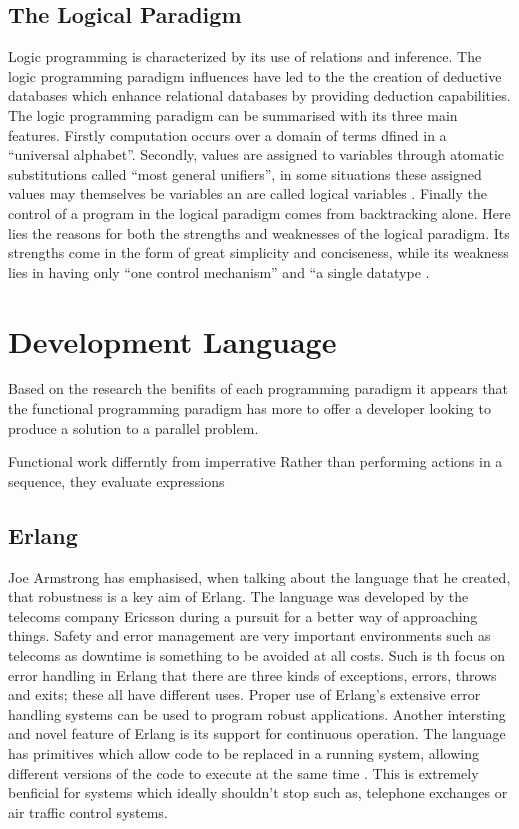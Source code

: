 \documentclass[main.tex]{subfiles}
\begin{document}
\subsection{The Logical Paradigm} %
Logic programming is characterized by its use of relations and inference.\cite{Aaby1996} The logic programming paradigm influences have led to the the creation of deductive databases which enhance relational databases by providing deduction capabilities. The logic programming paradigm can be summarised with its three main features. Firstly computation occurs over a domain of terms dfined in a ``universal alphabet''. Secondly, values are assigned to variables through atomatic substitutions called ``most general unifiers'', in some situations these assigned values may themselves be variables an are called logical variables \cite{Apt2001}. Finally the control of a program in the logical paradigm comes from backtracking alone. Here lies the reasons for both the strengths and weaknesses of the logical paradigm. Its strengths come in the form of great simplicity and conciseness, while its weakness lies in having only ``one control mechanism'' and ``a single datatype \cite{Apt2001}.

\section{Development Language}

Based on the research the benifits of each programming paradigm it appears that the functional programming paradigm has more to offer a developer looking to produce a solution to a parallel problem.

Functional work differntly from imperrative Rather than performing actions in a sequence, they evaluate expressions

\subsection{Erlang}

Joe Armstrong\cite{Armstrong2009} has emphasised, when talking about the language that he created, that robustness is a key aim of Erlang. The language was developed by the telecoms company Ericsson during a pursuit for a better way of approaching things. Safety and error management are very important environments such as telecoms as downtime is something to be avoided at all costs. Such is th focus on error handling in Erlang that there are three kinds of exceptions, errors, throws and exits; these all have different uses\cite{Trottier-Hebert2011}. Proper use of Erlang's extensive error handling systems can be used to program robust applications. Another intersting and novel feature of Erlang is its support for continuous operation. The language has primitives which allow code to be replaced in a running system, allowing different versions of the code to execute at the same time \cite{Armstrong1995}. This is extremely benficial for systems which ideally shouldn't stop such as, telephone exchanges or air traffic control systems. %
\end{document}
